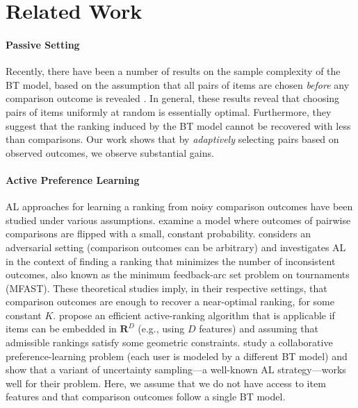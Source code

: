 \section{Related Work}  %
\label{rs:sec:relwork}

\paragraph{Passive Setting}
Recently, there have been a number of results on the sample complexity of the BT model, based on the assumption that all pairs of items are chosen \emph{before} any comparison outcome is revealed
\citep{negahban2012iterative, hajek2014minimax, rajkumar2014statistical, vojnovic2016parameter}.
In general, these results reveal that choosing pairs of items uniformly at random is essentially optimal.
Furthermore, they suggest that the ranking induced by the BT model cannot be recovered with less than  comparisons.
Our work shows that by \emph{adaptively} selecting pairs based on observed outcomes, we observe substantial gains.

\paragraph{Active Preference Learning}
AL approaches for learning a ranking from noisy comparison outcomes have been studied under various assumptions.
\citet{braverman2008noisy} examine a model where outcomes of pairwise comparisons are flipped with a small, constant probability.
\citet{ailon2012active} considers an adversarial setting (comparison outcomes can be arbitrary) and investigates AL in the context of finding a ranking that minimizes the number of inconsistent outcomes, also known as the minimum feedback-arc set problem on tournaments (MFAST).
These theoretical studies imply, in their respective settings, that  comparison outcomes are enough to recover a near-optimal ranking, for some constant $K$.
\citet{jamieson2011active} propose an efficient active-ranking algorithm that is applicable if items can be embedded in $\mathbf{R}^D$ (e.g., using $D$ features) and assuming that admissible rankings satisfy some geometric constraints.
\citet{wang2014active} study a collaborative preference-learning problem (each user is modeled by a different BT model) and show that a variant of uncertainty sampling---a well-known AL strategy---works well for their problem.
Here, we assume that we do not have access to item features and that comparison outcomes follow a single BT model.

